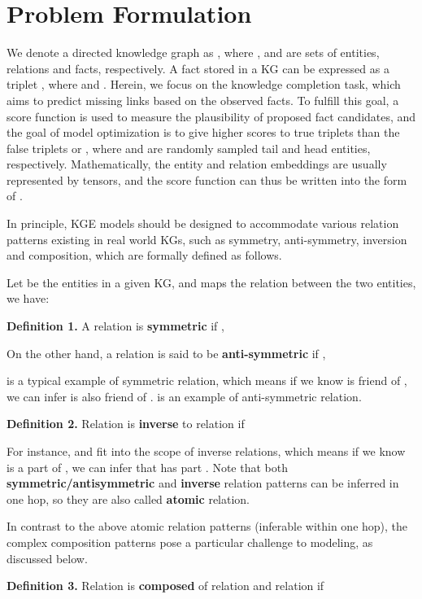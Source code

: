 \documentclass[11pt]{article}
\begin{document}
\section{Problem Formulation}

We denote a directed knowledge graph as , where ,  and  are sets of entities, relations and facts, respectively. A fact stored in a KG can be expressed as a triplet , where  and . Herein, we focus on the knowledge completion task, which aims to predict missing links based on the observed facts. To fulfill this goal, a score function is used to measure the plausibility of proposed fact candidates, and the goal of model optimization is to give higher scores to true triplets  than the false triplets  or , where  and  are randomly sampled tail and head entities, respectively. Mathematically, the entity and relation embeddings are usually represented by tensors, and the score function can thus be written into the form of . 

In principle, KGE models should be designed to accommodate various relation patterns existing in real world KGs, such as symmetry, anti-symmetry, inversion and composition, which are formally defined as follows.





Let  be the entities in a given KG, and  maps the relation between the two entities, we have:

{\textbf{Definition 1.} A relation  is \textbf{symmetric} if ,

\noindent On the other hand, a relation is said to be \textbf{anti-symmetric} if ,
}
 is a typical example of symmetric relation, which means if we know  is friend of , we can infer  is also friend of .  is an example of anti-symmetric relation.


\textbf{Definition 2.} Relation  is \textbf{inverse} to relation  if 

For instance,  and  fit into the scope of inverse relations, which means if we know  is a part of , we can infer that  has part . Note that both \textbf{symmetric/antisymmetric} and \textbf{inverse} relation patterns can be inferred in one hop, so they are also called \textbf{atomic} relation.

In contrast to the above atomic relation patterns (inferable within one hop), the complex composition patterns pose a particular challenge to modeling, as discussed below.

\textbf{Definition 3.} Relation  is \textbf{composed} of relation  and relation  if 
\end{document}
